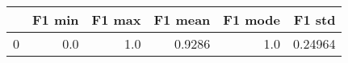 \begin{tabular}{lrrrrr}
\toprule
{} &  F1 min &  F1 max &  F1 mean &  F1 mode &   F1 std \\
\midrule
0 &     0.0 &     1.0 &   0.9286 &      1.0 &  0.24964 \\
\bottomrule
\end{tabular}
